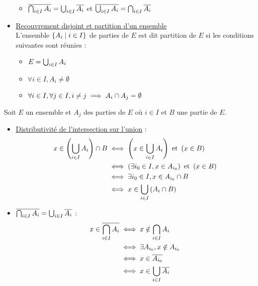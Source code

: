 \begin{defprop}
\begin{itemize}
\begin{itemize}
        \item \(\overline{\bigcap_{i \in I}A_i} = \bigcup_{i \in I} \overline{A_i}\) et \(\overline{\bigcup_{i \in I}A_i} = \bigcap_{i \in I}\overline{A_i}\)
    \end{itemize}
    \item \underline{Recouvrement disjoint et partition d’un ensemble}\\
    L’ensemble \(\left\lbrace A_i \;\middle|\; i \in I\right\rbrace\) de parties de \(E\) est dit partition de \(E\) si les conditions suivantes sont réunies :\\
    \begin{itemize}
        \item \(E = \bigcup_{i\in I}A_i\)
        \item \(\forall i \in I,A_i \neq \emptyset\)
        \item \(\forall i \in I,\forall j \in I, i\neq j \implies A_i\cap A_j = \emptyset\)
    \end{itemize}
\end{itemize}
\end{defprop}

\begin{dem}
    Soit \(E\) un ensemble et \(A_j\) des parties de \(E\) où \(i \in I\) et \(B\) une partie de \(E\).
    \begin{itemize}
        \item \underline{Distributivité de l'intersection sur l'union} :\\
        \begin{align*}
            x\in \left(\bigcup_{i\in I}A_i\right)\cap B &\iff \left(x \in \bigcup_{i\in I}A_i\right) \text{ et } \left(x \in B\right) \\
            &\iff \left(\exists i_0 \in I, x\in A_{i_0}\right) \text{ et } \left(x \in B\right)\\
            &\iff \exists i_0 \in I, x\in A_{i_0}\cap B \\
            &\iff x\in \bigcup_{i\in I}\left(A_i\cap B\right)
        \end{align*}
        \item \(\overline{\bigcap_{i\in I}A_i} = \bigcup_{i\in I}\overline{A_i}\) :\\
        \begin{align*}
            x \in \overline{\bigcap_{i\in I}A_i} &\iff x\notin \bigcap_{i \in I} A_i\\
            &\iff \exists A_{i_0}, x\notin A_{i_0}\\
            &\iff x\in \overline{A_{i_0}} \\
            &\iff x \in \bigcup_{i \in I} \overline{A_i}
        \end{align*}
    \end{itemize}
\end{dem}

